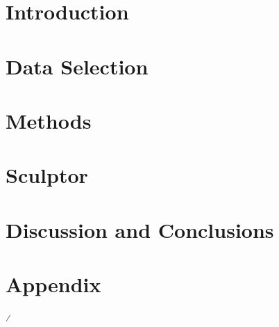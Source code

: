 \documentclass[12pt,oneside,letterpaper]{report}
\begin{document}





\chapter{Introduction}



\chapter{Data Selection}


\chapter{Methods}


\chapter{Sculptor}



\chapter{Discussion and Conclusions}


\newpage

 



\appendix
\chapter*{Appendix}
\renewcommand{\thesection}{A.\arabic{section}}
\renewcommand\thefigure{A.\arabic{figure}}    
\renewcommand\theequation{A.\arabic{equation}}    
\setcounter{figure}{0}
\setcounter{equation}{0}

\renewcommand*{\theHsection}{A.\arabic{section}}%
\renewcommand*{\theHsubsection}{A.\arabic{subsection}}%
\renewcommand*{\theHfigure}{A.\arabic{figure}}%
\renewcommand*{\theHequation}{A.\arabic{equation}}%







⁄
\end{document}
